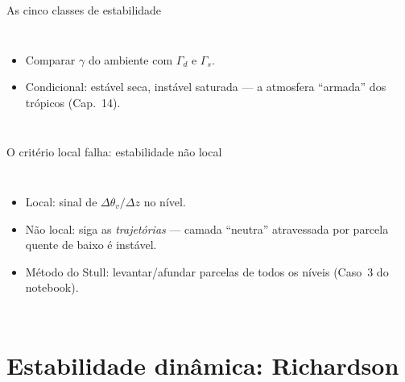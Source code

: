 \documentclass[aspectratio=169,11pt]{beamer}
\begin{document}
\begin{frame}{As cinco classes de estabilidade}
  \begin{columns}
    \begin{itemize}
      \item Comparar $\gamma$ do ambiente com $\Gamma_d$ e $\Gamma_s$.
      \item \alert{Condicional}: estável seca, instável saturada — a
            atmosfera ``armada'' dos trópicos (Cap.~14).
    \end{itemize}
  \end{columns}
\end{frame}

\begin{frame}{O critério local falha: estabilidade não local}
  \begin{columns}
    \begin{itemize}
      \item Local: sinal de $\Delta\theta_v/\Delta z$ no nível.
      \item \alert{Não local}: siga as \emph{trajetórias} — camada
            ``neutra'' atravessada por parcela quente de baixo é
            instável.
      \item Método do Stull: levantar/afundar parcelas de todos os
            níveis (Caso~3 do notebook).
    \end{itemize}
  \end{columns}
\end{frame}

\section{Estabilidade dinâmica: Richardson}
\end{document}
